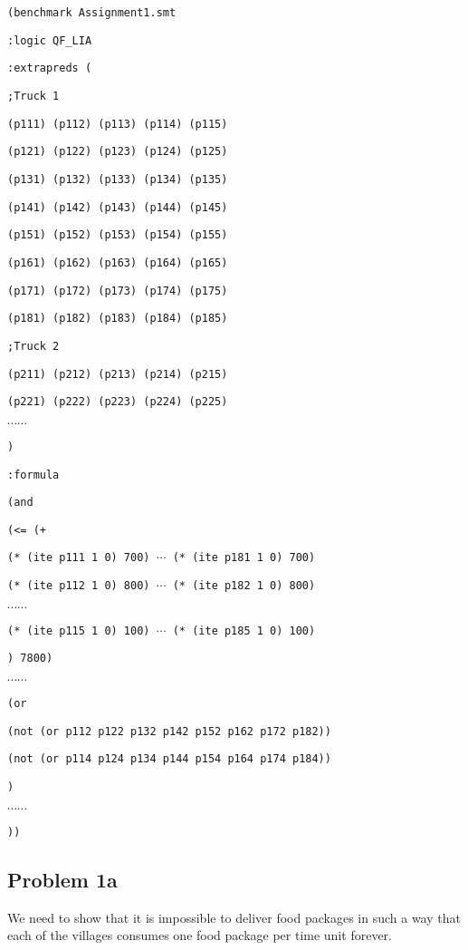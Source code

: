 \documentclass[a4paper]{article}
\begin{document}
{\footnotesize

{\tt (benchmark Assignment1.smt}

{\tt :logic QF\_LIA}

{\tt :extrapreds (}

{\tt ;Truck 1 }

{\tt (p111) (p112) (p113) (p114) (p115) }

{\tt (p121) (p122) (p123) (p124) (p125) }

{\tt (p131) (p132) (p133) (p134) (p135) }

{\tt (p141) (p142) (p143) (p144) (p145) }

{\tt (p151) (p152) (p153) (p154) (p155) }

{\tt (p161) (p162) (p163) (p164) (p165) }

{\tt (p171) (p172) (p173) (p174) (p175) }

{\tt (p181) (p182) (p183) (p184) (p185) }

{\tt ;Truck 2 }

{\tt (p211) (p212) (p213) (p214) (p215) }

{\tt (p221) (p222) (p223) (p224) (p225) }

$\cdots \cdots$

{\tt )}

{\tt :formula}

{\tt   (and}

{\tt (<= (+ }

{\tt (* (ite p111 1 0) 700) $\cdots$ (* (ite p181 1 0) 700)}

{\tt (* (ite p112 1 0) 800) $\cdots$ (* (ite p182 1 0) 800)}

$\cdots \cdots$

{\tt (* (ite p115 1 0) 100) $\cdots$ (* (ite p185 1 0) 100)}

{\tt ) 7800)}

$\cdots \cdots$

{\tt (or }

{\tt (not (or p112 p122 p132 p142 p152 p162 p172 p182)) }

{\tt (not (or p114 p124 p134 p144 p154 p164 p174 p184)) }

{\tt ) }

$\cdots \cdots$

{\tt )) }
}

	\subsection*{Problem 1a}
	We need to show that it is impossible to deliver food packages in such a way that each of the villages consumes one food package per time unit forever.
	
\end{document}
